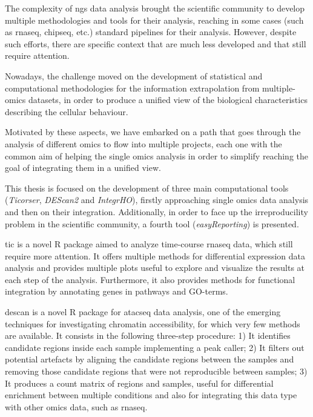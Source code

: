 The complexity of \gls{ngs} data analysis brought the scientific community to develop multiple methodologies and tools for their analysis, reaching in some cases (such as \gls{rnaseq}, \gls{chipseq}, etc.) standard pipelines for their analysis.
However, despite such efforts, there are specific context that are much less developed and that still require attention.

Nowadays, the challenge moved on the development of statistical and computational methodologies for the information extrapolation from multiple-omics datasets, in order to produce a unified view of the biological characteristics describing the cellular behaviour.

Motivated by these aspects, we have embarked on a path that goes through the analysis of different omics to flow into multiple projects, each one with the common aim of helping the single omics analysis in order to simplify reaching the goal of integrating them in a unified view.

This thesis is focused on the development of three main computational tools (\textit{Ticorser}, \textit{DEScan2} and \textit{IntegrHO}), firstly approaching single omics data analysis and then on their integration.
Additionally, in order to face up the irreproducility problem in the scientific community, a fourth tool (\textit{easyReporting}) is presented.

\gls{tic} is a novel R package aimed to analyze time-course \gls{rnaseq} data, which still require more attention. It offers multiple methods for differential expression data analysis and provides multiple plots useful to explore and visualize the results at each step of the analysis. Furthermore, it also provides methods for functional integration by annotating genes in pathways and GO-terms.

\gls{descan} is a novel R package for \gls{atacseq} data analysis, one of the emerging techniques for investigating chromatin accessibility, for which very few methods are available. It consists in the following three-step procedure: 1) It identifies candidate regions inside each sample implementing a peak caller; 2) It filters out potential artefacts by aligning the candidate regions between the samples and removing those candidate regions that were not reproducible between samples; 3) It produces a count matrix of regions and samples, useful for differential enrichment between multiple conditions and also for integrating this data type with other omics data, such as \gls{rnaseq}.


